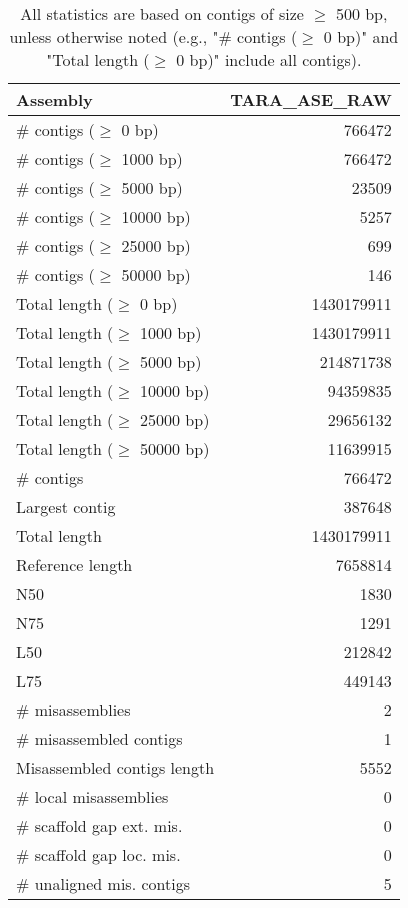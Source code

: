 \documentclass[12pt,a4paper]{article}
\begin{document}
\begin{table}[ht]
\begin{center}
\caption{All statistics are based on contigs of size $\geq$ 500 bp, unless otherwise noted (e.g., "\# contigs ($\geq$ 0 bp)" and "Total length ($\geq$ 0 bp)" include all contigs).}
\begin{tabular}{|l*{1}{|r}|}
\hline
Assembly & TARA\_ASE\_RAW \\ \hline
\# contigs ($\geq$ 0 bp) & 766472 \\ \hline
\# contigs ($\geq$ 1000 bp) & 766472 \\ \hline
\# contigs ($\geq$ 5000 bp) & 23509 \\ \hline
\# contigs ($\geq$ 10000 bp) & 5257 \\ \hline
\# contigs ($\geq$ 25000 bp) & 699 \\ \hline
\# contigs ($\geq$ 50000 bp) & 146 \\ \hline
Total length ($\geq$ 0 bp) & 1430179911 \\ \hline
Total length ($\geq$ 1000 bp) & 1430179911 \\ \hline
Total length ($\geq$ 5000 bp) & 214871738 \\ \hline
Total length ($\geq$ 10000 bp) & 94359835 \\ \hline
Total length ($\geq$ 25000 bp) & 29656132 \\ \hline
Total length ($\geq$ 50000 bp) & 11639915 \\ \hline
\# contigs & 766472 \\ \hline
Largest contig & 387648 \\ \hline
Total length & 1430179911 \\ \hline
Reference length & 7658814 \\ \hline
N50 & 1830 \\ \hline
N75 & 1291 \\ \hline
L50 & 212842 \\ \hline
L75 & 449143 \\ \hline
\# misassemblies & 2 \\ \hline
\# misassembled contigs & 1 \\ \hline
Misassembled contigs length & 5552 \\ \hline
\# local misassemblies & 0 \\ \hline
\# scaffold gap ext. mis. & 0 \\ \hline
\# scaffold gap loc. mis. & 0 \\ \hline
\# unaligned mis. contigs & 5 \\ \hline

\end{tabular}
\end{center}
\end{table}
\end{document}
